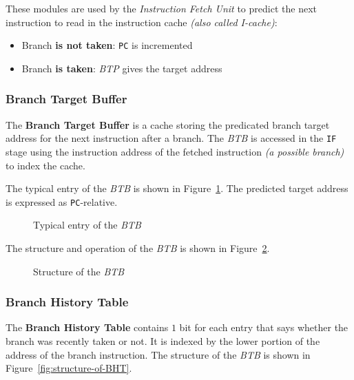 \documentclass[english]{article}
\begin{document}
These modules are used by the \textit{Instruction Fetch Unit} to predict the next instruction to read in the instruction cache \textit{(also called I-cache)}:

\begin{itemize}
  \item Branch \textbf{is not taken}: \texttt{PC} is incremented
  \item Branch \textbf{is taken}: \textit{BTP} gives the target address
\end{itemize}

\subsubsection{Branch Target Buffer}

The \textbf{Branch Target Buffer} is a cache storing the predicated branch target address for the next instruction after a branch.
The \textit{BTB} is accessed in the \texttt{IF} stage using the instruction address of the fetched instruction \textit{(a possible branch)} to index the cache.

The typical entry of the \textit{BTB} is shown in Figure~\ref{fig:typical-entry-BTB}.
The predicted target address is expressed as \texttt{PC}-relative.

\begin{figure}[htbp]
  \bigskip
  \centering
  \caption{Typical entry of the \textit{BTB}}
  \label{fig:typical-entry-BTB}
  \bigskip
\end{figure}

The structure and operation of the \textit{BTB} is shown in Figure~\ref{fig:structure-of-BTB}.

\begin{figure}[htbp]
  \bigskip
  \centering
  \caption{Structure of the \textit{BTB}}
  \label{fig:structure-of-BTB}
  \bigskip
\end{figure}

\subsubsection{Branch History Table}

The \textbf{Branch History Table} contains \(1\) bit for each entry that says whether the branch was recently taken or not.
It is indexed by the lower portion of the address of the branch instruction.
The structure of the \textit{BTB} is shown in Figure~\ref{fig:structure-of-BHT}.
\end{document}
